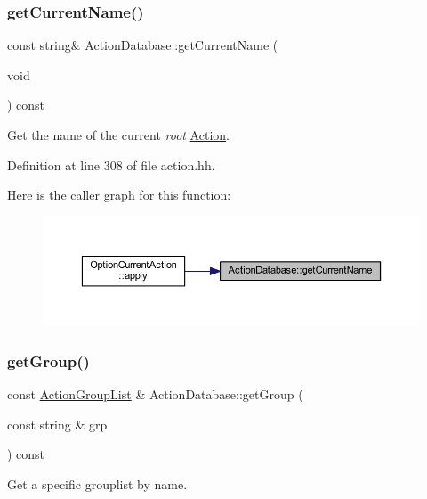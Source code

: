 \subsubsection{\texorpdfstring{getCurrentName()}{getCurrentName()}}
{\footnotesize\ttfamily const string\& Action\+Database\+::get\+Current\+Name (\begin{DoxyParamCaption}\item[{void}]{ }\end{DoxyParamCaption}) const\hspace{0.3cm}{\ttfamily [inline]}}



Get the name of the current {\itshape root} \mbox{\hyperlink{class_action}{Action}}. 



Definition at line 308 of file action.\+hh.

Here is the caller graph for this function\+:
\nopagebreak
\begin{figure}[H]
\begin{center}
\leavevmode
\includegraphics[width=350pt]{class_action_database_ae68921ffe5175dad6b6b1f2e44c77d6b_icgraph}
\end{center}
\end{figure}
\mbox{\label{class_action_database_ad8f31b8112d7da028a3091e176151f14}} 
\subsubsection{\texorpdfstring{getGroup()}{getGroup()}}
{\footnotesize\ttfamily const \mbox{\hyperlink{class_action_group_list}{Action\+Group\+List}} \& Action\+Database\+::get\+Group (\begin{DoxyParamCaption}\item[{const string \&}]{grp }\end{DoxyParamCaption}) const}



Get a specific grouplist by name. 



